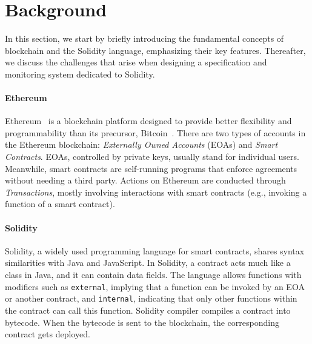 \section{Background} 
\label{sec:background}


In this section, we start by briefly introducing the fundamental concepts of blockchain and the Solidity language, emphasizing their key features. 
Thereafter, we discuss the challenges that arise when designing a specification and monitoring system dedicated to Solidity.

\paragraph{Ethereum}
Ethereum~\cite{buterin2014next} is a blockchain platform designed to  provide better flexibility and programmability than its precursor, Bitcoin~\cite{nakamoto2008bitcoin}.
There are two types of accounts in the Ethereum blockchain: \textit{Externally Owned Accounts} (EOAs) and \textit{Smart Contracts}. 
EOAs, controlled by private keys, usually stand for individual users. Meanwhile, smart contracts are self-running programs that enforce agreements without needing a third party. 
Actions on Ethereum are conducted through \textit{Transactions}, mostly involving interactions with smart contracts (e.g., invoking a function of a smart contract).
 
\paragraph{Solidity}
Solidity, a widely used programming language for smart contracts, shares syntax similarities with Java and JavaScript. 
In Solidity, a contract acts much like a class in Java, and it can contain data fields. 
The language allows functions with modifiers such as \texttt{external}, implying that a function can be invoked by an EOA or another contract, and \texttt{internal}, indicating that only other functions within the contract can call this function. 
Solidity compiler compiles a contract into bytecode.
When the bytecode is sent to the blockchain, the corresponding contract gets deployed.

